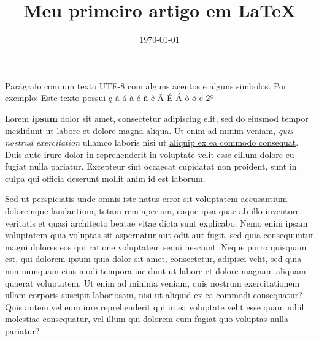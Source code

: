 \documentclass{article}
\title{Meu primeiro artigo em \LaTeX}
\date{\today}
\begin{document}
\maketitle

Parágrafo com um texto UTF-8 com alguns acentos e alguns simbolos.  
Por exemplo: Este texto possui ç ã á à é ñ ê Ã É Á ò õ e 2º 


\begin{flushright}
	Lorem \textbf{ipsum} dolor sit amet, consectetur adipiscing elit, sed do eiusmod tempor incididunt ut labore et dolore magna aliqua. Ut enim ad minim veniam, \textit{quis nostrud exercitation }ullamco laboris nisi ut \underline{aliquip ex ea commodo consequat}. Duis aute irure dolor in reprehenderit in voluptate velit esse cillum dolore eu fugiat nulla pariatur. Excepteur sint occaecat cupidatat non proident, sunt in culpa qui officia deserunt mollit anim id est laborum. %
\end{flushright}

Sed ut perspiciatis unde omnis iste natus error sit voluptatem accusantium doloremque laudantium, totam rem aperiam, eaque ipsa quae ab illo inventore veritatis et quasi architecto beatae vitae dicta sunt explicabo. Nemo enim ipsam voluptatem quia voluptas sit aspernatur aut odit aut fugit, sed quia consequuntur magni dolores eos qui ratione voluptatem sequi nesciunt. Neque porro quisquam est, qui dolorem ipsum quia dolor sit amet, consectetur, adipisci velit, sed quia non numquam eius modi tempora incidunt ut labore et dolore magnam aliquam quaerat voluptatem. Ut enim ad minima veniam, quis nostrum exercitationem ullam corporis suscipit laboriosam, nisi ut aliquid ex ea commodi consequatur? Quis autem vel eum iure reprehenderit qui in ea voluptate velit esse quam nihil molestiae consequatur, vel illum qui dolorem eum fugiat quo voluptas nulla pariatur?
\end{document}
